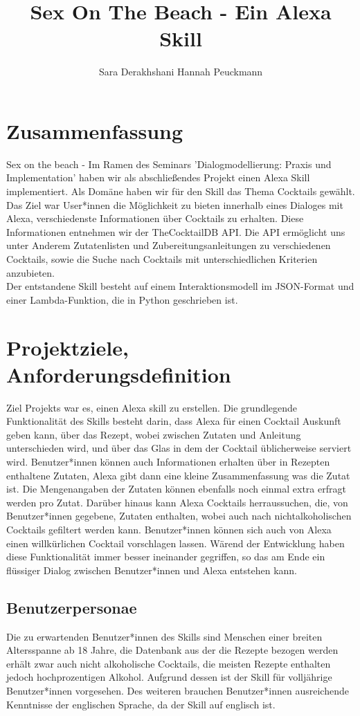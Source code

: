 \documentclass[12pt,letterpaper]{article}
\begin{document}
\title{Sex On The Beach - Ein Alexa Skill}
\author{Sara Derakhshani Hannah Peuckmann}
\maketitle
\thispagestyle{fancy}
\pagebreak
\tableofcontents
\pagebreak
\section{Zusammenfassung}
Sex on the beach - Im Ramen des Seminars 'Dialogmodellierung: Praxis und Implementation' haben wir als abschließendes Projekt einen Alexa Skill implementiert. Als Domäne haben wir für den Skill das Thema Cocktails gewählt. \\Das Ziel war User*innen die Möglichkeit zu bieten innerhalb eines Dialoges mit Alexa, verschiedenste Informationen über Cocktails zu erhalten. Diese Informationen entnehmen wir der TheCocktailDB API. Die API ermöglicht uns unter Anderem Zutatenlisten und Zubereitungsanleitungen zu verschiedenen Cocktails, sowie die Suche nach Cocktails mit unterschiedlichen Kriterien anzubieten. \\ Der entstandene Skill besteht auf einem Interaktionsmodell im JSON-Format und einer Lambda-Funktion, die in Python geschrieben ist. 

\section{Projektziele, Anforderungsdefinition}

Ziel Projekts war es, einen Alexa skill zu erstellen.
Die grundlegende Funktionalität des Skills besteht darin, dass Alexa für einen Cocktail Auskunft geben kann,
über das Rezept, wobei zwischen Zutaten und Anleitung unterschieden wird, und über das Glas in dem der Cocktail
üblicherweise serviert wird. Benutzer*innen können auch Informationen erhalten über in Rezepten enthaltene Zutaten,
Alexa gibt dann eine kleine Zusammenfassung was die Zutat ist. Die Mengenangaben der Zutaten können ebenfalls noch einmal extra erfragt werden pro Zutat.
Darüber hinaus kann Alexa Cocktails herraussuchen, die, von Benutzer*innen
gegebene, Zutaten enthalten, wobei auch nach nichtalkoholischen Cocktails gefiltert werden kann. 
Benutzer*innen können sich auch von Alexa einen willkürlichen Cocktail vorschlagen lassen.
Wärend der Entwicklung haben diese Funktionalität immer besser ineinander gegriffen, so das am Ende ein flüssiger Dialog
zwischen Benutzer*innen und Alexa entstehen kann.
\subsection{Benutzerpersonae}
Die zu erwartenden Benutzer*innen des Skills sind Menschen einer breiten Altersspanne ab 18 Jahre, die Datenbank aus der die Rezepte bezogen werden erhält zwar auch nicht alkoholische Cocktails, die meisten Rezepte enthalten jedoch hochprozentigen Alkohol. Aufgrund dessen ist der Skill für volljährige Benutzer*innen vorgesehen. Des weiteren  brauchen Benutzer*innen ausreichende Kenntnisse der englischen Sprache, da der Skill auf englisch ist.
\end{document}
